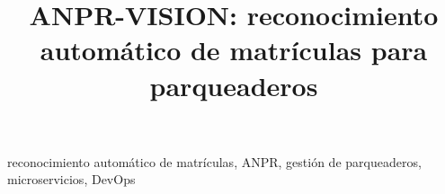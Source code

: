 \documentclass[conference]{IEEEtran}
\begin{document}
\title{ANPR-VISION: reconocimiento automático de matrículas para parqueaderos}
\author{
}

\maketitle

\begin{abstract}

\end{abstract}

\begin{IEEEkeywords}
reconocimiento automático de matrículas, ANPR, gestión de parqueaderos, microservicios, DevOps
\end{IEEEkeywords}










\printbibliography
\end{document}
